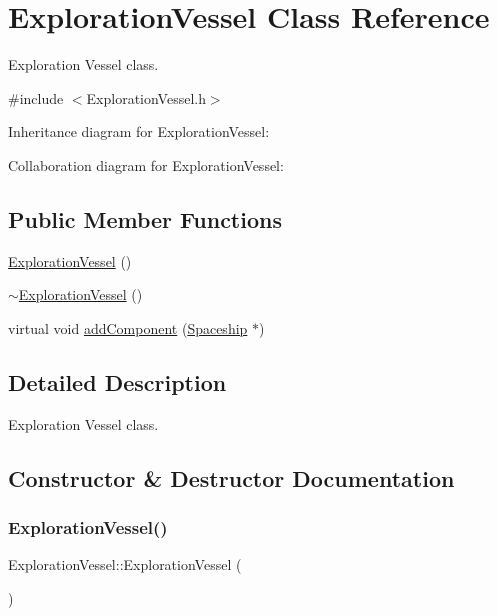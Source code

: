 \hypertarget{classExplorationVessel}{}\section{Exploration\+Vessel Class Reference}
\label{classExplorationVessel}


Exploration Vessel class.  




{\ttfamily \#include $<$Exploration\+Vessel.\+h$>$}



Inheritance diagram for Exploration\+Vessel\+:


Collaboration diagram for Exploration\+Vessel\+:
\subsection*{Public Member Functions}
\begin{DoxyCompactItemize}
\item 
\hyperlink{classExplorationVessel_ab664e2a5b901063c15d86e13f3b981f6}{Exploration\+Vessel} ()
\item 
\hyperlink{classExplorationVessel_ac7b29c63250f7263808af4e21e412cce}{$\sim$\+Exploration\+Vessel} ()
\item 
virtual void \hyperlink{classExplorationVessel_ab7a52cecc1b68a5b9b1c478b00d67f65}{add\+Component} (\hyperlink{classSpaceship}{Spaceship} $\ast$)
\end{DoxyCompactItemize}


\subsection{Detailed Description}
Exploration Vessel class. 

\subsection{Constructor \& Destructor Documentation}
\mbox{\label{classExplorationVessel_ab664e2a5b901063c15d86e13f3b981f6}} 
\subsubsection{\texorpdfstring{Exploration\+Vessel()}{ExplorationVessel()}}
{\footnotesize\ttfamily Exploration\+Vessel\+::\+Exploration\+Vessel (\begin{DoxyParamCaption}{ }\end{DoxyParamCaption})\hspace{0.3cm}{\ttfamily [inline]}}

